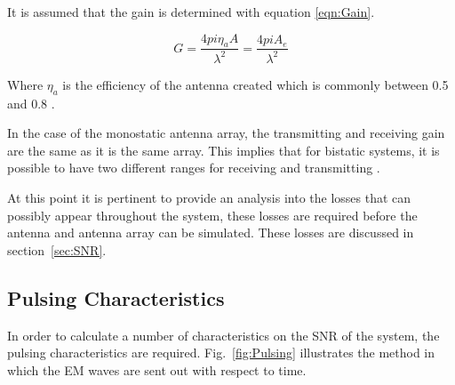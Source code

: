 \documentclass[11pt]{witseiepaper}
\begin{document}
It is assumed that the gain is determined with equation \ref{eqn:Gain}.

\begin{equation} \label{eqn:Gain}
G = \frac{4 pi \eta_{a} A}{\lambda^2} = \frac{4 pi A_{e}}{\lambda^2}
\end{equation}

Where $\eta_{a}$ is the efficiency of the antenna created which is commonly between 0.5 and 0.8 \cite[p.~64]{radarHandbook}.

In the case of the monostatic antenna array, the transmitting and receiving gain are the same as it is the same array. This implies that for bistatic systems, it is possible to have two different ranges for receiving and transmitting \cite[p.~64]{radarHandbook}.


At this point it is pertinent to provide an analysis into the losses that can possibly appear throughout the system, these losses are required before the antenna and antenna array can be simulated. These losses are discussed in section~\ref{sec:SNR}.



\subsection{Pulsing Characteristics} \label{sec:PulsingCharacteristics}
In order to calculate a number of characteristics on the SNR of the system, the pulsing characteristics are required. Fig.~\ref{fig:Pulsing} illustrates the method in which the EM waves are sent out with respect to time. 
\end{document}
